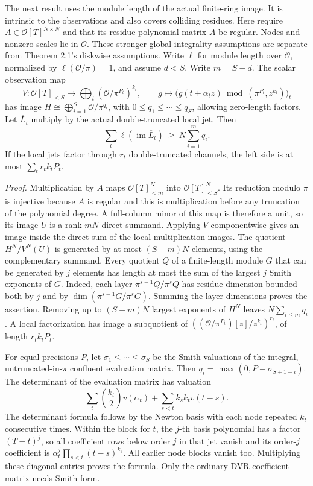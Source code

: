 \documentclass[
  11pt,
]{article}
\begin{document}
The next result uses the module length of the actual finite-ring image.
It is intrinsic to the observations and also covers colliding residues.
Here require \(A\in\mathcal O[T]^{N\times N}\) and that its residue
polynomial matrix \(\bar A\) be regular. Nodes and nonzero scales lie in
\(\mathcal O\). These stronger global integrality assumptions are
separate from Theorem 2.1's diskwise assumptions. Write \(\ell\) for
module length over \(\mathcal O\), normalized by
\(\ell(\mathcal O/\pi)=1\), and assume \(d<S\). Write \(m=S-d\). The
scalar observation map \[
 V:\mathcal O[T]_{<S}\longrightarrow\bigoplus_t(\mathcal O/\pi^{P_t})^{k_t},\qquad
 g\longmapsto \big(g(t+\alpha_t z)\bmod (\pi^{P_t},z^{k_t})\big)_t
\] has image \(H\cong\bigoplus_{i=1}^S\mathcal O/\pi^{q_i}\), with
\(0\le q_1\le\cdots\le q_S\), allowing zero-length factors. Let
\(\overline L_t\) multiply by the actual double-truncated local jet.
Then \[
             \sum_t\ell(\operatorname{im}\overline L_t)\ \ge\ N\sum_{i=1}^{m} q_i. \tag{A.10}
\] If the local jets factor through \(r_t\) double-truncated channels,
the left side is at most \(\sum_t r_t k_t P_t\).

\emph{Proof.} Multiplication by \(A\) maps \(\mathcal O[T]^N_{<m}\) into
\(\mathcal O[T]^N_{<S}\). Its reduction modulo \(\pi\) is injective
because \(\bar A\) is regular and this is multiplication before any
truncation of the polynomial degree. A full-column minor of this map is
therefore a unit, so its image \(U\) is a rank-\(mN\) direct summand.
Applying \(V\) componentwise gives an image inside the direct sum of the
local multiplication images. The quotient \(H^N/V^N(U)\) is generated by
at most \((S-m)N\) elements, using the complementary summand. Every
quotient \(Q\) of a finite-length module \(G\) that can be generated by
\(j\) elements has length at most the sum of the largest \(j\) Smith
exponents of \(G\). Indeed, each layer \(\pi^{s-1}Q/\pi^sQ\) has residue
dimension bounded both by \(j\) and by \(\dim(\pi^{s-1}G/\pi^sG)\).
Summing the layer dimensions proves the assertion. Removing up to
\((S-m)N\) largest exponents of \(H^N\) leaves \(N\sum_{i\le m}q_i\). A
local factorization has image a subquotient of
\(((\mathcal O/\pi^{P_t})[z]/z^{k_t})^{r_t}\), of length \(r_t k_tP_t\).

For equal precisions \(P\), let \(\sigma_1\le\cdots\le\sigma_S\) be the
Smith valuations of the integral, untruncated-in-\(\pi\) confluent
evaluation matrix. Then \(q_i=\max(0,P-\sigma_{S+1-i})\). The
determinant of the evaluation matrix has valuation \[
 \sum_t \binom{k_t}{2}v(\alpha_t)+\sum_{s<t}k_sk_t v(t-s).
\] The determinant formula follows by the Newton basis with each node
repeated \(k_t\) consecutive times. Within the block for \(t\), the
\(j\)-th basis polynomial has a factor \((T-t)^j\), so all coefficient
rows below order \(j\) in that jet vanish and its order-\(j\)
coefficient is \(\alpha_t^j\prod_{s<t}(t-s)^{k_s}\). All earlier node
blocks vanish too. Multiplying these diagonal entries proves the
formula. Only the ordinary DVR coefficient matrix needs Smith form.
\end{document}
